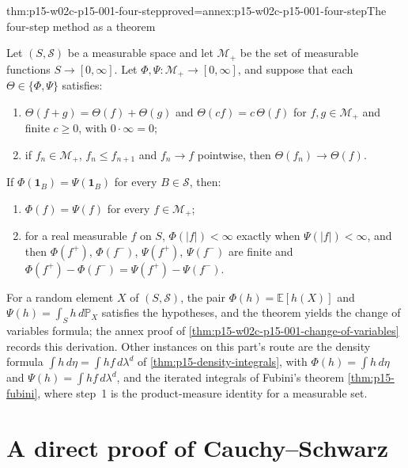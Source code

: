 \begin{hbtheorem}{thm:p15-w02c-p15-001-four-step}{proved=annex:p15-w02c-p15-001-four-step}{The four-step method as a theorem}
\par\nobreak
Let \((S,\mathcal S)\) be a measurable space and let \(\mathcal M_+\) be
the set of measurable functions \(S\to[0,\infty]\). Let
\(\Phi,\Psi:\mathcal M_+\to[0,\infty]\), and suppose that each
\(\Theta\in\{\Phi,\Psi\}\) satisfies:
\begin{enumerate}
\item[(a)] \(\Theta(f+g)=\Theta(f)+\Theta(g)\) and
      \(\Theta(cf)=c\,\Theta(f)\) for \(f,g\in\mathcal M_+\) and finite
      \(c\geq0\), with \(0\cdot\infty=0\);
\item[(b)] if \(f_n\in\mathcal M_+\), \(f_n\leq f_{n+1}\) and
      \(f_n\to f\) pointwise, then \(\Theta(f_n)\to\Theta(f)\).
\end{enumerate}
If \(\Phi(\mathbf1_B)=\Psi(\mathbf1_B)\) for every \(B\in\mathcal S\),
then:
\begin{enumerate}
\item \(\Phi(f)=\Psi(f)\) for every \(f\in\mathcal M_+\);
\item for a real measurable \(f\) on \(S\), \(\Phi(|f|)<\infty\) exactly
      when \(\Psi(|f|)<\infty\), and then \(\Phi(f^+)\), \(\Phi(f^-)\),
      \(\Psi(f^+)\), \(\Psi(f^-)\) are finite and
      \(\Phi(f^+)-\Phi(f^-)=\Psi(f^+)-\Psi(f^-)\).
\end{enumerate}
\end{hbtheorem}

For a random element \(X\) of \((S,\mathcal S)\), the pair
\(\Phi(h)=\mathbb E[h(X)]\) and \(\Psi(h)=\int_Sh\,d\mathbb P_X\)
satisfies the hypotheses, and the theorem yields the change of variables
formula; the annex proof of \cref{thm:p15-w02c-p15-001-change-of-variables}
records this derivation. Other instances on this part's route are the
density formula \(\int h\,d\eta=\int hf\,d\lambda^d\) of
\cref{thm:p15-density-integrals}, with \(\Phi(h)=\int h\,d\eta\) and
\(\Psi(h)=\int hf\,d\lambda^d\), and the iterated integrals of Fubini's
theorem \cref{thm:p15-fubini}, where step~1 is the product-measure
identity for a measurable set.

\section{A direct proof of Cauchy--Schwarz}
\label{sec:p15-w02c-p15-001-cauchy-schwarz}

